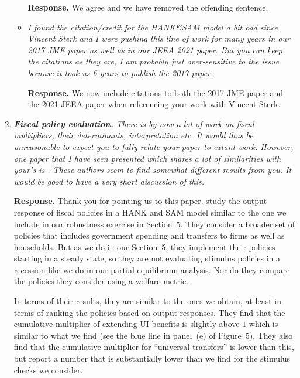 \documentclass[12pt,letterpaper,english]{article}
\begin{document}
\begin{enumerate}
\begin{itemize}
		\noindent \textbf{Response.} We agree and we have removed the offending sentence.
		
		\item \textit{I found the citation/credit for the HANK\&SAM model a bit odd since Vincent Sterk and I were pushing this line of work for many years in our 2017 JME	paper as well as in our JEEA 2021 paper. But you can keep the citations as they are, I am probably just over-sensitive to the issue because it took us 6 years to publish the 2017 paper.}
		
		\noindent \textbf{Response.} We now include citations to both the 2017 JME paper and the 2021 JEEA paper when referencing your work with Vincent Sterk. 
	\end{itemize}
	
\item \textit{\textbf{Fiscal policy evaluation.} There is by now a lot of work on fiscal multipliers, their determinants, interpretation etc. It would thus be unreasonable to expect you to fully relate your paper to extant work. However, one paper that I have seen presented which shares a lot of similarities with your's is \citet{broer2025stimulus}. These authors seem to find somewhat different results from you. It would be good	to have a very short discussion of this.}	

\noindent \textbf{Response.} Thank you for pointing us to this paper. \citeauthor{broer2025stimulus} study the output response of fiscal policies in a HANK and SAM model similar to the one we include in our robustness exercise in Section~5. They consider a broader set of policies that includes government spending and transfers to firms as well as households. But as we do in our Section~5, they implement their policies starting in a steady state, so they are not evaluating stimulus policies in a recession like we do in our partial equilibrium analysis. Nor do they compare the policies they consider using a welfare metric. 

In terms of their results, they are similar to the ones we obtain, at least in terms of ranking the policies based on output responses. They find that the cumulative multiplier of extending UI benefits is slightly above $1$ which is similar to what we find (see the blue line in panel~(e) of Figure~5). They also find that the cumulative multiplier for ``universal transfers'' is lower than this, but report a number that is substantially lower than we find for the stimulus checks we consider. 


\end{enumerate}
\end{document}
